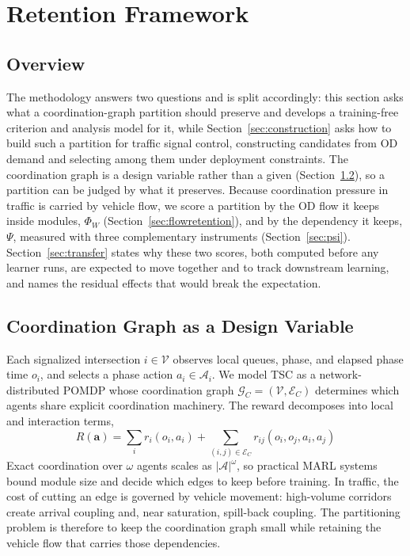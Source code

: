 \documentclass[journal]{IEEEtran}
\theoremstyle{definition}
\begin{document}
\section{Retention Framework}
\label{sec:method}

\subsection{Overview}
\label{sec:overview}

The methodology answers two questions and is split accordingly: this section asks what a coordination-graph partition should preserve and develops a training-free criterion and analysis model for it, while Section~\ref{sec:construction} asks how to build such a partition for traffic signal control, constructing candidates from OD demand and selecting among them under deployment constraints. The coordination graph is a design variable rather than a given (Section~\ref{sec:ndpomdp}), so a partition can be judged by what it preserves. Because coordination pressure in traffic is carried by vehicle flow, we score a partition by the OD flow it keeps inside modules, $\Phi_W$ (Section~\ref{sec:flowretention}), and by the dependency it keeps, $\Psi$, measured with three complementary instruments (Section~\ref{sec:psi}). Section~\ref{sec:transfer} states why these two scores, both computed before any learner runs, are expected to move together and to track downstream learning, and names the residual effects that would break the expectation.

\subsection{Coordination Graph as a Design Variable}
\label{sec:ndpomdp}

Each signalized intersection $i \in \mathcal{V}$ observes local queues, phase, and elapsed phase time $o_i$, and selects a phase action $a_i \in \mathcal{A}_i$. We model TSC as a network-distributed POMDP whose coordination graph $\mathcal{G}_C=(\mathcal{V},\mathcal{E}_C)$ determines which agents share explicit coordination machinery.
The reward decomposes into local and interaction terms,
\begin{equation}
    R(\mathbf{a})
    =
    \sum_i r_i(o_i,a_i)
    +
    \sum_{(i,j)\in\mathcal{E}_C}
    r_{ij}(o_i,o_j,a_i,a_j)
    \label{eq:ndpomdp}
\end{equation}
Exact coordination over $\omega$ agents scales as $|\mathcal{A}|^\omega$, so practical MARL systems bound module size and decide which edges to keep before training. In traffic, the cost of cutting an edge is governed by vehicle movement: high-volume corridors create arrival coupling and, near saturation, spill-back coupling. The partitioning problem is therefore to keep the coordination graph small while retaining the vehicle flow that carries those dependencies.
\end{document}
